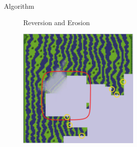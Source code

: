\documentclass{beamer}
\begin{document}
%
%
%

%
%
%

%
%
%


  \begin{frame}[fragile]{Algorithm}

    \begin{figure}
      Reversion and Erosion

      \includegraphics[width=6cm]{img/fm_0036_reversion_erosion.pdf}

    \end{figure}
  \end{frame}
\end{document}
